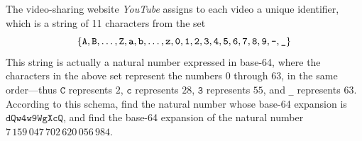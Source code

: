 \begin{chapex}
The video-sharing website \textit{YouTube} assigns to each video a unique identifier, which is a string of 11 characters from the set
\[ \{ \mathtt{A}, \mathtt{B}, \dots, \mathtt{Z}, \mathtt{a}, \mathtt{b}, \dots, \mathtt{z}, \mathtt{0}, \mathtt{1}, \mathtt{2}, \mathtt{3}, \mathtt{4}, \mathtt{5}, \mathtt{6}, \mathtt{7}, \mathtt{8}, \mathtt{9}, \text{\texttt{-}}, \text{\texttt{\_}} \} \]
This string is actually a natural number expressed in base-64, where the characters in the above set represent the numbers $0$ through $63$, in the same order---thus $\mathtt{C}$ represents $2$, $\mathtt{c}$ represents $28$, $\mathtt{3}$ represents $55$, and \texttt{\_} represents $63$. According to this schema, find the natural number whose base-64 expansion is $\mathtt{dQw4w9WgXcQ}$, and find the base-64 expansion of the natural number $7\,159\,047\,702\,620\,056\,984$.
\end{chapex}

